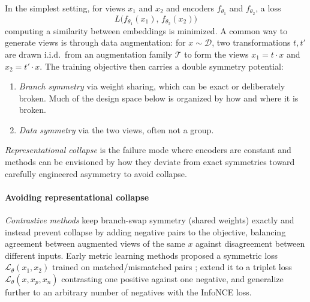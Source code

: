 \documentclass[mathematics,review,submit,moreauthors]{Definitions/mdpi}
\begin{document}
In the simplest setting, for views $x_1$ and $x_2$ and encoders $f_{\theta_1}$ and $f_{\theta_2}$, a loss 
$$L\big(f_{\theta_1}(x_1),\,f_{\theta_2}(x_2)\big)$$
computing a similarity between embeddings is minimized.
A common way to generate views is through data augmentation: for $x\sim\mathcal{D}$, two transformations $t,t'$ are drawn i.i.d.\ from an augmentation family $\mathcal{T}$ to form the views $x_1=t\cdot x$ and $x_2=t'\cdot x$.
The training objective then carries a double symmetry potential:
\begin{enumerate}
    \item \emph{Branch symmetry} via weight sharing, which can be exact or deliberately broken. Much of the design space below is organized by how and where it is broken.
    \item \emph{Data symmetry} via the two views, often not a group.
\end{enumerate}

\emph{Representational collapse} is the failure mode where encoders are constant and methods can be envisioned by how they deviate from exact symmetries toward carefully engineered asymmetry to avoid collapse.

\paragraph{Avoiding representational collapse}
\emph{Contrastive methods} keep branch-swap symmetry (shared weights) exactly and instead prevent collapse by adding negative pairs to the objective, balancing agreement between augmented views of the same $x$ against disagreement between different inputs.
Early metric learning methods proposed a symmetric loss $\mathcal{L}_\theta(x_1,x_2)$ trained on matched/mismatched pairs \citep{chopra20052icsccvprc,hadsell20062icsccvpr-v2c}; \citet{schroff20152iccvprc} extend it to a triplet loss $\mathcal{L}_\theta(x,x_p,x_n)$ contrasting one positive against one negative, and \citet{oord2018a} generalize further to an arbitrary number of negatives with the InfoNCE loss.
\end{document}
